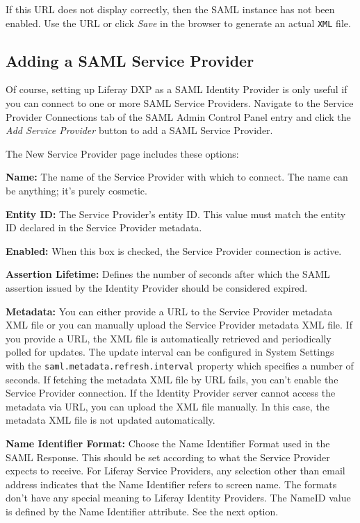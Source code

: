 If this URL does not display correctly, then the SAML instance has not
been enabled. Use the URL or click \emph{Save} in the browser to
generate an actual \texttt{XML} file.

\subsection{Adding a SAML Service
Provider}\label{adding-a-saml-service-provider}

Of course, setting up Liferay DXP as a SAML Identity Provider is only
useful if you can connect to one or more SAML Service Providers.
Navigate to the Service Provider Connections tab of the SAML Admin
Control Panel entry and click the \emph{Add Service Provider} button to
add a SAML Service Provider.

The New Service Provider page includes these options:

\textbf{Name:} The name of the Service Provider with which to connect.
The name can be anything; it's purely cosmetic.

\textbf{Entity ID:} The Service Provider's entity ID. This value must
match the entity ID declared in the Service Provider metadata.

\textbf{Enabled:} When this box is checked, the Service Provider
connection is active.

\textbf{Assertion Lifetime:} Defines the number of seconds after which
the SAML assertion issued by the Identity Provider should be considered
expired.

\textbf{Metadata:} You can either provide a URL to the Service Provider
metadata XML file or you can manually upload the Service Provider
metadata XML file. If you provide a URL, the XML file is automatically
retrieved and periodically polled for updates. The update interval can
be configured in System Settings with the
\texttt{saml.metadata.refresh.interval} property which specifies a
number of seconds. If fetching the metadata XML file by URL fails, you
can't enable the Service Provider connection. If the Identity Provider
server cannot access the metadata via URL, you can upload the XML file
manually. In this case, the metadata XML file is not updated
automatically.

\textbf{Name Identifier Format:} Choose the Name Identifier Format used
in the SAML Response. This should be set according to what the Service
Provider expects to receive. For Liferay Service Providers, any
selection other than email address indicates that the Name Identifier
refers to screen name. The formats don't have any special meaning to
Liferay Identity Providers. The NameID value is defined by the Name
Identifier attribute. See the next option.

